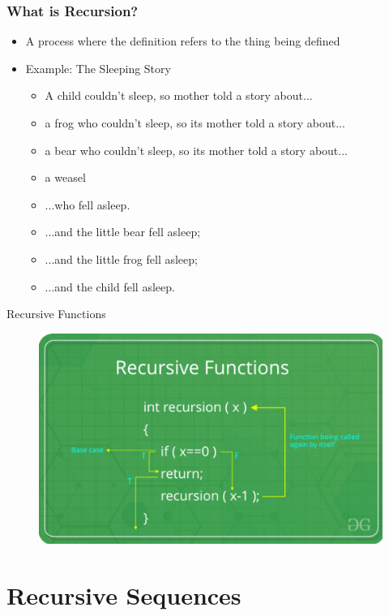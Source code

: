 \documentclass{beamer}
\begin{document}
\begin{frame}
\frametitle{What is Recursion?}
\begin{itemize}
    \item A process where the definition refers to the thing being defined
    \item Example: The Sleeping Story
    \begin{itemize}
        \item A child couldn't sleep, so mother told a story about...
        \item a frog who couldn't sleep, so its mother told a story about...
        \item a bear who couldn't sleep, so its mother told a story about...
        \item a weasel
        \item ...who fell asleep.
        \item ...and the little bear fell asleep;
        \item ...and the little frog fell asleep;
        \item...and the child fell asleep.
    \end{itemize}
\end{itemize}
\end{frame}
\begin{frame}{Recursive Functions}
\begin{figure}
    \centering
    \includegraphics[width=1\linewidth]{CS12Recursive Functions/Screenshot 2024-11-11 152930.png}
\end{figure}
    
\end{frame}
\section{Recursive Sequences}
\end{document}
